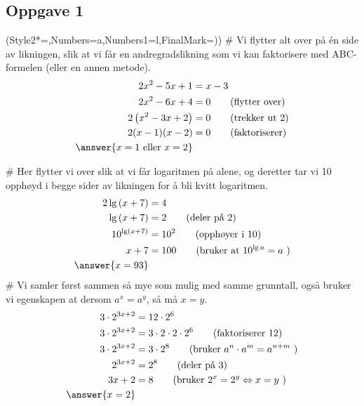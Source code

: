 \subsection*{Oppgave 1}
\begin{easylist}[enumerate]
\ListProperties(Style2*=,Numbers=a,Numbers1=l,FinalMark={)})
# Vi flytter alt over på én side av likningen, slik at vi får en andregradslikning som vi kan faktorisere med ABC-formelen (eller en annen metode).
\begin{align*}
	2x^2 - 5x + 1 &= x - 3 \\
	2x^2 - 6x + 4 &= 0 \qquad \text{(flytter over)}\\
	2 \left( x^2 - 3x + 2 \right) &= 0 \qquad \text{(trekker ut 2)} \\
	2 (x-1)(x-2) &= 0 \qquad \text{(faktoriserer)}\\
	\answer{x = 1 \text{ eller } x = 2} &	
\end{align*}

# Her flytter vi over slik at vi får logaritmen på alene, og deretter tar vi 10 opphøyd i begge sider av likningen for å bli kvitt logaritmen.
\begin{align*}
	2 \lg \left(x + 7\right) &= 4 \\
	\lg \left(x + 7\right) &= 2  \qquad \text{(deler på 2)}\\
	10^{\lg \left(x + 7\right)} &= 10^2  \qquad \text{(opphøyer i 10)}\\
	x + 7 &= 100 \qquad \text{(bruker at } 10^{\lg a} = a \text{ )} \\
	\answer{x = 93}
\end{align*}
# Vi samler først sammen så mye som mulig med samme grunntall, også bruker vi egenskapen at dersom $a^x = a^y$, så må $x=y$.
\begin{align*}
	3 \cdot 2^{3x+ 2} &= 12 \cdot 2^6 \\
	3 \cdot 2^{3x+ 2} &= 3 \cdot 2 \cdot 2 \cdot 2^6 \qquad \text{(faktoriserer 12)} \\
	3 \cdot 2^{3x+ 2} &= 3 \cdot 2^8 \qquad \text{(bruker } a^n \cdot a^m = a^{n+m} \text{ )} \\
	 2^{3x+ 2} &= 2^8 \qquad \text{(deler på 3)} \\
	  {3x+ 2} &= 8 \qquad \text{(bruker } 2^x = 2^y \Leftrightarrow x = y \text{ )} \\
	  \answer{x = 2}
\end{align*}
\end{easylist}

